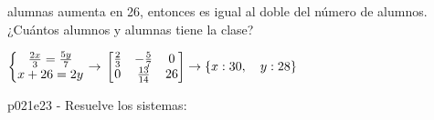 \documentclass[spanish, 11pt]{exam}
\begin{document}
\begin{questions}
\begin{multicols}{1}
\begin{parts}
alumnas aumenta en 26, entonces es igual al doble del número de alumnos. ¿Cuántos alumnos y alumnas
tiene la clase?  \begin{solution}  $ \left\{\begin{matrix}\frac{2x}{3}=\frac{5y}{7}\\ x+26=2y\\ \end{matrix}\right.  \rightarrow  \\\left[\begin{matrix}\frac{2}{3} & - \frac{5}{7} & 0\\0 & \frac{13}{14} & 26\end{matrix}\right] \rightarrow  \left \{ x : 30, \quad y : 28\right \} $  \end{solution}
        \end{parts}
        \end{multicols}
        \question p021e23 - Resuelve los sistemas:
        \begin{multicols}{2} 

\end{multicols}
\end{questions}
\end{document}
